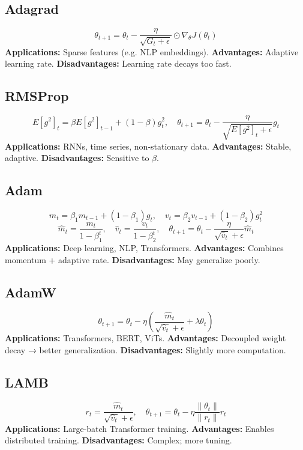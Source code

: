\documentclass[11pt]{article}
\begin{document}
\subsection{Adagrad}
\[
\theta_{t+1} = \theta_t - \frac{\eta}{\sqrt{G_t + \epsilon}} \odot \nabla_\theta J(\theta_t)
\]
\textbf{Applications:} Sparse features (e.g. NLP embeddings).  
\textbf{Advantages:} Adaptive learning rate.  
\textbf{Disadvantages:} Learning rate decays too fast.

\subsection{RMSProp}
\[
E[g^2]_t = \beta E[g^2]_{t-1} + (1 - \beta)g_t^2, \quad
\theta_{t+1} = \theta_t - \frac{\eta}{\sqrt{E[g^2]_t + \epsilon}}g_t
\]
\textbf{Applications:} RNNs, time series, non-stationary data.  
\textbf{Advantages:} Stable, adaptive.  
\textbf{Disadvantages:} Sensitive to $\beta$.

\subsection{Adam}
\[
m_t = \beta_1 m_{t-1} + (1 - \beta_1)g_t,\quad
v_t = \beta_2 v_{t-1} + (1 - \beta_2)g_t^2
\]
\[
\hat{m}_t = \frac{m_t}{1 - \beta_1^t},\quad
\hat{v}_t = \frac{v_t}{1 - \beta_2^t},\quad
\theta_{t+1} = \theta_t - \frac{\eta}{\sqrt{\hat{v}_t} + \epsilon}\hat{m}_t
\]
\textbf{Applications:} Deep learning, NLP, Transformers.  
\textbf{Advantages:} Combines momentum + adaptive rate.  
\textbf{Disadvantages:} May generalize poorly.

\subsection{AdamW}
\[
\theta_{t+1} = \theta_t - \eta\left(\frac{\hat{m}_t}{\sqrt{\hat{v}_t} + \epsilon} + \lambda \theta_t\right)
\]
\textbf{Applications:} Transformers, BERT, ViTs.  
\textbf{Advantages:} Decoupled weight decay → better generalization.  
\textbf{Disadvantages:} Slightly more computation.

\subsection{LAMB}
\[
r_t = \frac{\hat{m}_t}{\sqrt{\hat{v}_t} + \epsilon}, \quad
\theta_{t+1} = \theta_t - \eta \frac{\|\theta_t\|}{\|r_t\|} r_t
\]
\textbf{Applications:} Large-batch Transformer training.  
\textbf{Advantages:} Enables distributed training.  
\textbf{Disadvantages:} Complex; more tuning.
\end{document}
